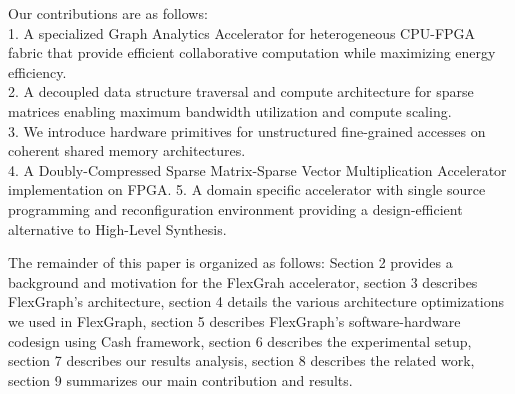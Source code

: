 Our contributions are as follows:\\
1.	A specialized Graph Analytics Accelerator for heterogeneous CPU-FPGA fabric that provide efficient collaborative computation while maximizing energy efficiency.\\
2. 	A decoupled data structure traversal and compute architecture for sparse matrices enabling maximum bandwidth utilization and compute scaling.\\
3.	We introduce hardware primitives for unstructured fine-grained accesses on coherent shared memory architectures.\\
4. 	A Doubly-Compressed Sparse Matrix-Sparse Vector Multiplication Accelerator implementation on FPGA. 
5. 	A domain specific accelerator with single source programming and reconfiguration environment providing a design-efficient alternative to High-Level Synthesis.  

The remainder of this paper is organized as follows:
Section 2 provides a background and motivation for the FlexGrah accelerator, section 3 describes FlexGraph's architecture, section 4 details the various architecture optimizations we used in FlexGraph, section 5 describes FlexGraph's software-hardware codesign using Cash \cite{Cash} framework, section 6 describes the experimental setup, section 7 describes our results analysis, section 8 describes the related work, section 9 summarizes our main contribution and results.